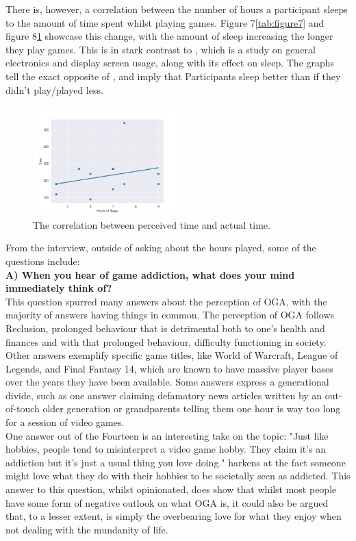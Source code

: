 \documentclass[conference]{IEEEtran}
\begin{document}
There is, however, a correlation between the number of hours a participant sleeps to the amount of time spent whilst playing games. Figure 7\ref{tab:figure7} and figure 8\ref{tab:figure8} showcase this change, with the amount of sleep increasing the longer they play games. This is in stark contrast to \cite{Yamazaki2022}, which is a study on general electronics and display screen usage, along with its effect on sleep. The graphs tell the exact opposite of \cite{Yamazaki2022}, and imply that Participants sleep better than if they didn't play/played less.


\begin{figure}[H]
\includegraphics[width = 0.5\textwidth]{Graph3}
\caption{The correlation between perceived time and actual time.}
\label{tab:figure8}
\end{figure}


From the interview, outside of asking about the hours played, some of the questions include:\\

 \textbf{A) When you hear of game addiction, what does your mind immediately think of?}\\

This question spurred many answers about the perception of OGA, with the majority of answers having things in common. The perception of OGA follows Reclusion, prolonged behaviour that is detrimental both to one's health and finances and with that prolonged behaviour, difficulty functioning in society. Other answers exemplify specific game titles, like World of Warcraft, League of Legends, and Final Fantasy 14, which are known to have massive player bases over the years they have been available. Some answers express a generational divide, such as one answer claiming defamatory news articles written by an out-of-touch older generation or grandparents telling them one hour is way too long for a session of video games.\\

One answer out of the Fourteen is an interesting take on the topic: "Just like hobbies, people tend to misinterpret a video game hobby. They claim it's an addiction but it's just a usual thing you love doing." harkens at the fact someone might love what they do with their hobbies to be societally seen as addicted. This answer to this question, whilst opinionated, does show that whilst most people have some form of negative outlook on what OGA is, it could also be argued that, to a lesser extent, is simply the overbearing love for what they enjoy when not dealing with the mundanity of life.\\
\end{document}
